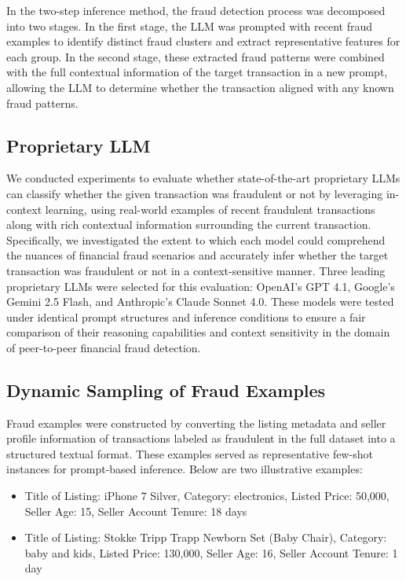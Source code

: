 \documentclass[sigconf]{acmart}
\begin{document}
In the two-step inference method, the fraud detection process was decomposed into two stages. In the first stage, the LLM was prompted with recent fraud examples to identify distinct fraud clusters and extract representative features for each group. In the second stage, these extracted fraud patterns were combined with the full contextual information of the target transaction in a new prompt, allowing the LLM to determine whether the transaction aligned with any known fraud patterns.




\subsection{Proprietary LLM}\label{proprietary_llm}
We conducted experiments to evaluate whether state-of-the-art proprietary LLMs can classify whether the given transaction was fraudulent or not by leveraging in-context learning, using real-world examples of recent fraudulent transactions along with rich contextual information surrounding the current transaction. Specifically, we investigated the extent to which each model could comprehend the nuances of financial fraud scenarios and accurately infer whether the target transaction was fraudulent or not in a context-sensitive manner.
Three leading proprietary LLMs were selected for this evaluation: OpenAI's GPT 4.1, Google's Gemini 2.5 Flash, and Anthropic's Claude Sonnet 4.0. These models were tested under identical prompt structures and inference conditions to ensure a fair comparison of their reasoning capabilities and context sensitivity in the domain of peer-to-peer financial fraud detection.





\subsection{Dynamic Sampling of Fraud Examples}\label{fraud_examples}
Fraud examples were constructed by converting the listing metadata and seller profile information of transactions labeled as fraudulent in the full dataset into a structured textual format. These examples served as representative few-shot instances for prompt-based inference. Below are two illustrative examples:

\begin{itemize}
  \item Title of Listing: iPhone 7 Silver, Category: electronics, Listed Price: 50,000, Seller Age: 15, Seller Account Tenure: 18 days
  \item Title of Listing: Stokke Tripp Trapp Newborn Set (Baby Chair), Category: baby and kids, Listed Price: 130,000, Seller Age: 16, Seller Account Tenure: 1 day
\end{itemize}
\end{document}
